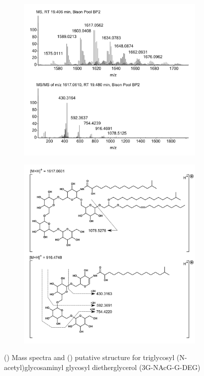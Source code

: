 \begin{figure}[h]
\centering
    \begin{subfigure}[b]{1\linewidth}
       \includegraphics[width=\linewidth]{figs_app1/3G-NAcG-G_1}
       \caption{}
        \label{fig:3G-NAcG-G-MS}
    \end{subfigure}
\end{figure}
\newpage
\begin{figure}[h] \ContinuedFloat
    \begin{subfigure}[b]{1\linewidth}
       \includegraphics[width=\linewidth]{figs_app1/3G-NAcG-G_2}
       \caption{}
        \label{fig:3G-NAcG-G-structure}
    \end{subfigure}
\caption{() Mass spectra and () putative structure for triglycosyl (N-acetyl)glycosaminyl glycosyl dietherglycerol (3G-NAcG-G-DEG)}
\label{fig:3G-NAcG-G}
\end{figure}


